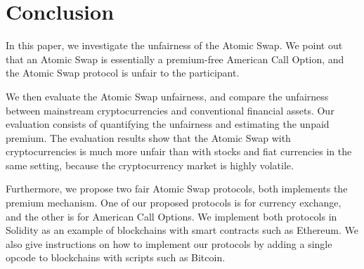\section{Conclusion}
\label{sec:conclusion}


In this paper, we investigate the unfairness of the Atomic Swap.
We point out that an Atomic Swap is essentially a premium-free American Call Option,
and the Atomic Swap protocol is unfair to the participant.

We then evaluate the Atomic Swap unfairness, and compare the unfairness between mainstream cryptocurrencies and conventional financial assets.
Our evaluation consists of quantifying the unfairness and estimating the unpaid premium.
The evaluation results show that the Atomic Swap with cryptocurrencies is much more unfair than with stocks and fiat currencies in the same setting, because the cryptocurrency market is highly volatile.

Furthermore, we propose two fair Atomic Swap protocols, both implements the premium mechanism.
One of our proposed protocols is for currency exchange, and the other is for American Call Options.
We implement both protocols in Solidity as an example of blockchains with smart contracts such as Ethereum.
We also give instructions on how to implement our protocols by adding a single opcode to blockchains with scripts such as Bitcoin.